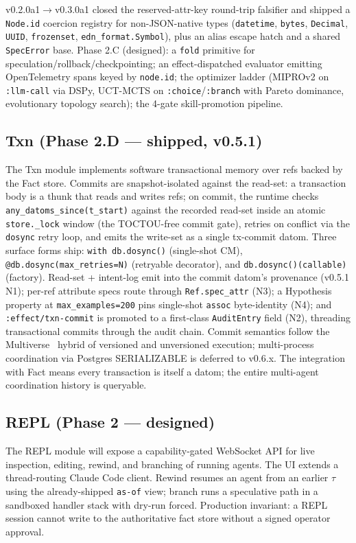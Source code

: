 \documentclass[anon]{nesy2026}   %
\newcommand{\C}[1]{\texttt{#1}}
\begin{document}
v0.2.0a1$\to$v0.3.0a1 closed the reserved-attr-key round-trip falsifier and shipped a \C{Node.id} coercion registry for non-JSON-native types (\C{datetime}, \C{bytes}, \C{Decimal}, \C{UUID}, \C{frozenset}, \C{edn\_format.Symbol}), plus an alias escape hatch and a shared \C{SpecError} base. Phase 2.C (designed): a \C{fold} primitive for speculation/rollback/checkpointing; an effect-dispatched evaluator emitting OpenTelemetry spans keyed by \C{node.id}; the optimizer ladder (MIPROv2 on \C{:llm-call} via DSPy, UCT-MCTS on \C{:choice}/\C{:branch} with Pareto dominance, evolutionary topology search); the 4-gate skill-promotion pipeline.

\subsection{Txn (Phase 2.D --- shipped, v0.5.1)}\label{sec:impl-txn}

The Txn module implements software transactional memory over refs backed by the Fact store. Commits are snapshot-isolated against the read-set: a transaction body is a thunk that reads and writes refs; on commit, the runtime checks \C{any\_datoms\_since(t\_start)} against the recorded read-set inside an atomic \C{store.\_lock} window (the TOCTOU-free commit gate), retries on conflict via the \C{dosync} retry loop, and emits the write-set as a single tx-commit datom. Three surface forms ship: \C{with db.dosync()} (single-shot CM), \C{@db.dosync(max\_retries=N)} (retryable decorator), and \C{db.dosync()(callable)} (factory). Read-set + intent-log emit into the commit datom's provenance (v0.5.1 N1); per-ref attribute specs route through \C{Ref.spec\_attr} (N3); a Hypothesis property at \C{max\_examples=200} pins single-shot \C{assoc} byte-identity (N4); and \C{:effect/txn-commit} is promoted to a first-class \C{AuditEntry} field (N2), threading transactional commits through the audit chain. Commit semantics follow the Multiverse~\citep{bieniusa2026multiverse} hybrid of versioned and unversioned execution; multi-process coordination via Postgres SERIALIZABLE is deferred to v0.6.x. The integration with Fact means every transaction is itself a datom; the entire multi-agent coordination history is queryable.

\subsection{REPL (Phase 2 --- designed)}\label{sec:impl-repl}

The REPL module will expose a capability-gated WebSocket API for live inspection, editing, rewind, and branching of running agents. The UI extends a thread-routing Claude Code client. Rewind resumes an agent from an earlier $\tau$ using the already-shipped \C{as-of} view; branch runs a speculative path in a sandboxed handler stack with dry-run forced. Production invariant: a REPL session cannot write to the authoritative fact store without a signed operator approval.
\end{document}
